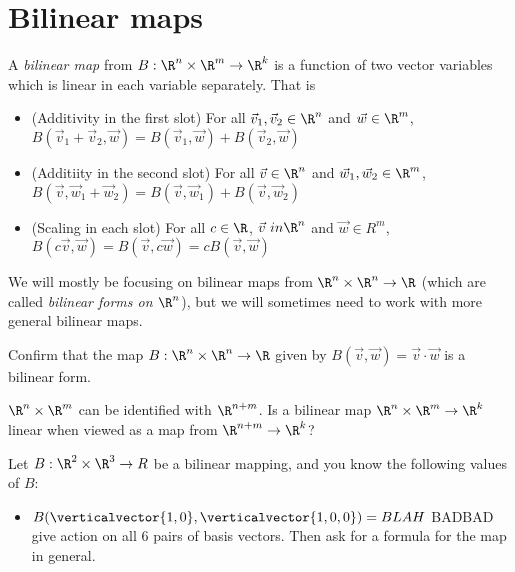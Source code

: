 
\section{Bilinear maps}
	
	\begin{definition}
		A \textit{bilinear map} from $B: \R^n \times \R^m \to \R^k$ is a function of two vector variables which is linear in each variable separately. 
		That is
			\begin{itemize}
				\item (Additivity in the first slot) For all $\vec{v}_1,\vec{v}_2 \in \R^n$ and $\vec{w} \in \R^m$, $B(\vec{v}_1+\vec{v}_2,\vec{w}) = B(\vec{v}_1,\vec{w})+B(\vec{v}_2,\vec{w})$
				\item (Additiity in the second slot) For all $\vec{v} \in \R^n$ and $\vec{w}_1,\vec{w}_2 \in \R^m$, $B(\vec{v},\vec{w}_1+\vec{w}_2) = B(\vec{v},\vec{w}_1)+B(\vec{v},\vec{w}_2)$
				\item (Scaling in each slot) For all $c \in \R$, $\vec{v} \ in \R^n$ and $\vec{w} \in R^m$, $B(c\vec{v},\vec{w}) = B(\vec{v},c\vec{w}) = cB(\vec{v},\vec{w})$
			\end{itemize}
	\end{definition}
	
	We will mostly be focusing on bilinear maps from $\R^n \times \R^n \to \R$ (which are called \textit{bilinear forms on $\R^n$}), but we will sometimes need to work with more general bilinear maps.
	
	\begin{question}
		Confirm that the map $B:\R^n \times \R^n \to \R$ given by $B(\vec{v},\vec{w}) = \vec{v} \cdot \vec{w}$ is a bilinear form.
	\end{question}
	
	\begin{question}
		$\R^n \times \R^m$ can be identified with $\R^{n+m}$.  Is a bilinear map $\R^n \times \R^m \to \R^k$ linear when viewed as a map from $\R^{n+m} \to \R^k$?
	\end{question}
	
	\begin{question}
		Let  $B:\R^2 \times \R^3 \to R$ be a bilinear mapping, and you know the following values of $B$:
			\begin{itemize}
				\item $B(\verticalvector{1,0},\verticalvector{1,0,0}) = BLAH$
				BADBAD give action on all $6$ pairs of basis vectors.  Then ask for a formula for the map in general. 
			\end{itemize}
	\end{question}
	
